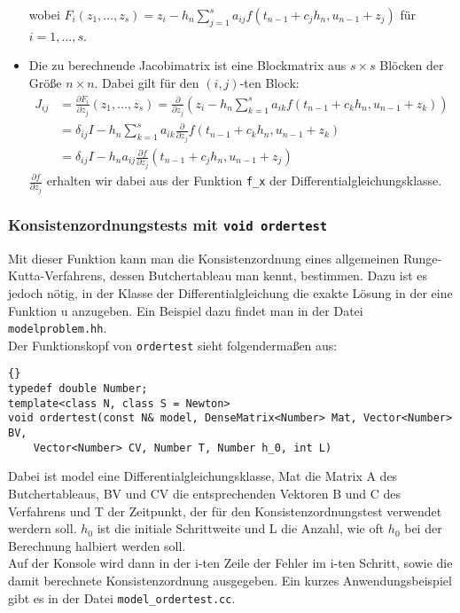 \documentclass[a4paper,11pt]{article}
\theoremstyle{definition}
\begin{document}
\begin{itemize}
wobei $F_i(z_1,...,z_s) = z_i-h_n \sum_{j=1}^s a_{ij}f(t_{n-1}+c_jh_n, u_{n-1}+z_j)$ für $i = 1,...,s$.
\item Die zu berechnende Jacobimatrix ist eine Blockmatrix aus $s\times s$ Blöcken der Größe $n \times n$. Dabei gilt für den $(i,j)$-ten Block: \\
\begin{align} J_{ij} &= \frac{\partial F_i}{\partial z_j}(z_1,...,z_s) = \frac{\partial}{\partial z_j}(z_i - h_n \sum_{k=1}^s a_{ik}f(t_{n-1}+c_kh_n, u_{n-1}+z_k)) \\ &= \delta_{ij}I-h_n \sum_{k=1}^s a_{ik} \frac{\partial}{\partial z_j}f(t_{n-1}+c_kh_n, u_{n-1}+z_k)
\\ &= \delta_{ij}I-h_n a_{ij} \frac{\partial f}{\partial z_j}(t_{n-1}+c_jh_n, u_{n-1}+z_j)
\end{align}
$ \frac{\partial f}{\partial z_j}$ erhalten wir dabei aus der Funktion \lstinline{f_x} der Differentialgleichungsklasse.
\end{itemize}

\subsubsection{Konsistenzordnungstests mit \lstinline{void ordertest}}
Mit dieser Funktion kann man die Konsistenzordnung eines allgemeinen Runge-Kutta-Verfahrens, dessen Butchertableau man kennt, bestimmen. Dazu ist es jedoch nötig, in der Klasse der Differentialgleichung die exakte Lösung in der eine Funktion u anzugeben.
Ein Beispiel dazu findet man in der Datei \lstinline{modelproblem.hh}.\\
Der Funktionskopf von \lstinline{ordertest} sieht folgendermaßen aus:
{\footnotesize{\begin{lstlisting}{}
typedef double Number;
template<class N, class S = Newton>
void ordertest(const N& model, DenseMatrix<Number> Mat, Vector<Number> BV, 
	Vector<Number> CV, Number T, Number h_0, int L)
\end{lstlisting}}}
Dabei ist model eine Differentialgleichungsklasse, Mat die Matrix A des Butchertableaus, BV und CV die entsprechenden Vektoren B und C des Verfahrens und T der Zeitpunkt, der für den Konsistenzordnungstest verwendet werdern soll. $h_0$ ist die initiale Schrittweite und L die Anzahl, wie oft $h_0$ bei der Berechnung halbiert werden soll.\\
Auf der Konsole wird dann in der i-ten Zeile der Fehler im i-ten Schritt, sowie die damit berechnete Konsistenzordnung ausgegeben.
Ein kurzes Anwendungsbeispiel gibt es in der Datei \lstinline{model_ordertest.cc}.
\end{document}

